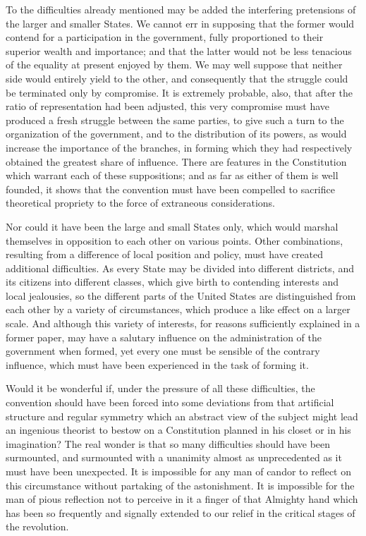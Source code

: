 To the difficulties already mentioned may be added the interfering pretensions of the larger and smaller States. We cannot err in supposing that the former would contend for a participation in the government, fully proportioned to their superior wealth and importance; and that the latter would not be less tenacious of the equality at present enjoyed by them. We may well suppose that neither side would entirely yield to the other, and consequently that the struggle could be terminated only by compromise. It is extremely probable, also, that after the ratio of representation had been adjusted, this very compromise must have produced a fresh struggle between the same parties, to give such a turn to the organization of the government, and to the distribution of its powers, as would increase the importance of the branches, in forming which they had respectively obtained the greatest share of influence. There are features in the Constitution which warrant each of these suppositions; and as far as either of them is well founded, it shows that the convention must have been compelled to sacrifice theoretical propriety to the force of extraneous considerations.

Nor could it have been the large and small States only, which would marshal themselves in opposition to each other on various points. Other combinations, resulting from a difference of local position and policy, must have created additional difficulties. As every State may be divided into different districts, and its citizens into different classes, which give birth to contending interests and local jealousies, so the different parts of the United States are distinguished from each other by a variety of circumstances, which produce a like effect on a larger scale. And although this variety of interests, for reasons sufficiently explained in a former paper, may have a salutary influence on the administration of the government when formed, yet every one must be sensible of the contrary influence, which must have been experienced in the task of forming it.

Would it be wonderful if, under the pressure of all these difficulties, the convention should have been forced into some deviations from that artificial structure and regular symmetry which an abstract view of the subject might lead an ingenious theorist to bestow on a Constitution planned in his closet or in his imagination? The real wonder is that so many difficulties should have been surmounted, and surmounted with a unanimity almost as unprecedented as it must have been unexpected. It is impossible for any man of candor to reflect on this circumstance without partaking of the astonishment. It is impossible for the man of pious reflection not to perceive in it a finger of that Almighty hand which has been so frequently and signally extended to our relief in the critical stages of the revolution.

